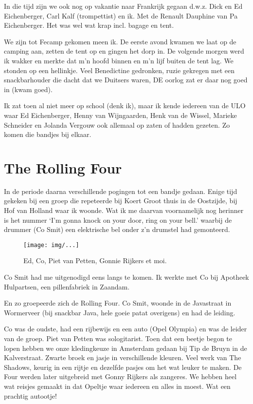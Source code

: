 \documentclass[10pt,twoside,openright]{memoir}
\begin{document}
In die tijd zijn we ook nog op vakantie naar Frankrijk gegaan d.w.z. Dick en Ed Eichenberger, Carl Kalf (trompettist) en ik. Met de Renault Dauphine van Pa Eichenberger. Het was wel wat krap incl. bagage en tent. 

We zijn tot Fecamp gekomen meen ik. De eerste avond kwamen we laat op de camping aan, zetten de tent op en gingen het dorp in. De volgende morgen werd ik wakker en merkte dat m’n hoofd binnen en m'n lijf buiten de tent lag. We stonden op een hellinkje. Veel Benedictine gedronken, ruzie gekregen met een snackbarhouder die dacht dat we Duitsers waren, DE oorlog zat er daar nog goed in (kwam goed). 

Ik zat toen al niet meer op school (denk ik), maar ik kende iedereen van de ULO waar Ed Eichenberger, Henny van Wijngaarden, Henk van de Wissel, Marieke Schneider en Jolanda Vergouw ook allemaal op zaten of hadden gezeten. Zo komen die bandjes bij elkaar.

\chapter{The Rolling Four} %
\label{cha:rollingfour}

In de periode daarna verschillende pogingen tot een bandje gedaan. Enige tijd gekeken bij een groep die repeteerde bij Koert Groot thuis in de Oostzijde, bij Hof van Holland waar ik woonde. Wat ik me daarvan voornamelijk nog herinner is het nummer ‘I’m gonna knock on your door, ring on your bell.’ waarbij de drummer (Co Smit) een elektrische bel onder z’n drumstel had gemonteerd.

\begin{figure}[t]
\texttt{[image: img/...]}
\caption{Ed, Co, Piet van Petten, Gonnie Rijkers et moi.}
\end{figure}

Co Smit had me uitgenodigd eens langs te komen. Ik werkte met Co bij Apotheek Hulpartsen, een pillenfabriek in Zaandam.

En zo groepeerde zich de Rolling Four. Co Smit, woonde in de Javastraat in Wormerveer (bij snackbar Java, hele goeie patat overigens) en had de leiding.

Co was de oudste, had een rijbewijs en een auto (Opel Olympia) en was de leider van de groep. Piet van Petten was sologitarist. Toen dat een beetje begon te lopen hebben we onze kledingkeuze in Amsterdam gedaan bij Tip de Bruyn in de Kalverstraat. Zwarte broek en jasje in verschillende kleuren. Veel werk van The Shadows, keurig in een rijtje en dezelfde pasjes om het wat leuker te maken. De Four werden later uitgebreid met Gonny Rijkers als zangeres. We hebben heel wat reisjes gemaakt in dat Opeltje waar iedereen en alles in moest. Wat een prachtig autootje!
\end{document}
